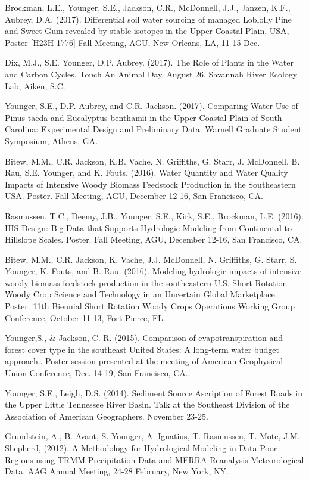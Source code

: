 \documentclass[10pt,letterpaper]{article}
\begin{document}
\begin{hangparas}{.25in}{1}
	Brockman, L.E., Younger, S.E., Jackson, C.R., McDonnell, J.J., Janzen, K.F., Aubrey, D.A. (2017). Differential soil water sourcing of managed Loblolly Pine and Sweet Gum revealed by stable isotopes in the Upper Coastal Plain, USA, Poster [H23H-1776] Fall Meeting, AGU, New Orleans, LA, 11-15 Dec.
	
	Dix, M.J., S.E. Younger, D.P. Aubrey. (2017). The Role of Plants in the Water and Carbon Cycles. Touch An Animal Day, August 26, Savannah River Ecology Lab, Aiken, S.C.
	
	Younger, S.E., D.P. Aubrey, and C.R. Jackson. (2017). Comparing Water Use of Pinus taeda and Eucalyptus benthamii in the Upper Coastal Plain of South Carolina: Experimental Design and Preliminary Data. Warnell Graduate Student Symposium, Athens, GA. 
	
	Bitew, M.M., C.R. Jackson, K.B. Vache, N. Griffiths, G. Starr, J. McDonnell, B. Rau, S.E. Younger, and K. Fouts. (2016). Water Quantity and Water Quality Impacts of Intensive Woody Biomass Feedstock Production in the Southeastern USA. Poster. Fall Meeting, AGU, December 12-16, San Francisco, CA. 
	
	Rasmussen, T.C., Deemy, J.B., Younger, S.E., Kirk, S.E., Brockman, L.E. (2016). HIS Design: Big Data that Supports Hydrologic Modeling from Continental to Hillslope Scales. Poster. Fall Meeting, AGU, December 12-16, San Francisco, CA. 
	
	Bitew, M.M., C.R. Jackson, K. Vache, J.J. McDonnell, N. Griffiths, G. Starr, S. Younger, K. Fouts, and B. Rau. (2016). Modeling hydrologic impacts of intensive woody biomass feedstock production in the southeastern U.S. Short Rotation Woody Crop Science and Technology in an Uncertain Global Marketplace. Poster. 11th Biennial Short Rotation Woody Crops Operations Working Group Conference, October 11-13, Fort Pierce, FL.
	
	Younger,S., \& Jackson, C. R. (2015). Comparison of evapotranspiration and forest cover type in the southeast United States: A long-term water budget approach.. Poster session presented at the meeting of American Geophysical Union Conference, Dec. 14-19, San Francisco, CA..
	
	Younger, S.E., Leigh, D.S. (2014). Sediment Source Ascription of Forest Roads in the Upper Little Tennessee River Basin. Talk at the Southeast Division of the Association of American Geographers. November 23-25.
	
	Grundstein, A., B. Avant, S. Younger, A. Ignatius, T. Rasmussen, T. Mote, J.M. Shepherd, (2012). A Methodology for Hydrological Modeling in Data Poor Regions using TRMM Precipitation Data and MERRA Reanalysis Meteorological Data. AAG Annual Meeting, 24-28 February, New York, NY.
	

\end{hangparas}
\end{document}

